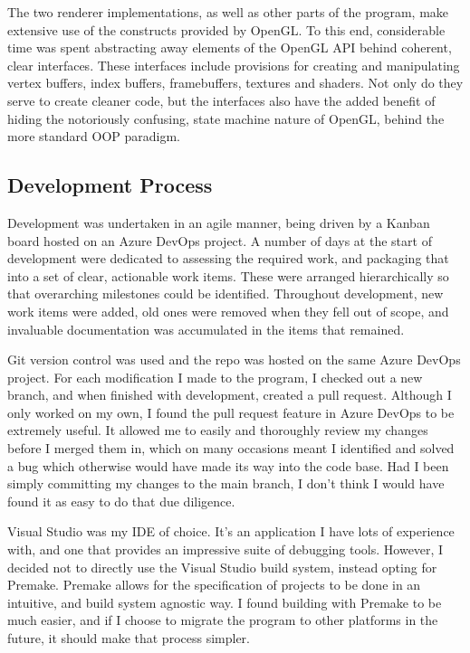 The two renderer implementations, as well as other parts of the program, make extensive use of the constructs provided by OpenGL. To this end, considerable time was spent abstracting away elements of the OpenGL API behind coherent, clear interfaces. These interfaces include provisions for creating and manipulating vertex buffers, index buffers, framebuffers, textures and shaders. Not only do they serve to create cleaner code, but the interfaces also have the added benefit of hiding the notoriously confusing, state machine nature of OpenGL, behind the more standard OOP paradigm.

\subsection{Development Process}

Development was undertaken in an agile manner, being driven by a Kanban board hosted on an Azure DevOps project. A number of days at the start of development were dedicated to assessing the required work, and packaging that into a set of clear, actionable work items. These were arranged hierarchically so that overarching milestones could be identified. Throughout development, new work items were added, old ones were removed when they fell out of scope, and invaluable documentation was accumulated in the items that remained.

Git version control was used and the repo was hosted on the same Azure DevOps project. For each modification I made to the program, I checked out a new branch, and when finished with development, created a pull request. Although I only worked on my own, I found the pull request feature in Azure DevOps to be extremely useful. It allowed me to easily and thoroughly review my changes before I merged them in, which on many occasions meant I identified and solved a bug which otherwise would have made its way into the code base. Had I been simply committing my changes to the main branch, I don't think I would have found it as easy to do that due diligence.

Visual Studio was my IDE of choice. It's an application I have lots of experience with, and one that provides an impressive suite of debugging tools. However, I decided not to directly use the Visual Studio build system, instead opting for Premake. Premake allows for the specification of projects to be done in an intuitive, and build system agnostic way. I found building with Premake to be much easier, and if I choose to migrate the program to other platforms in the future, it should make that process simpler.

